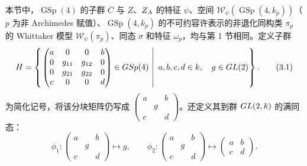 本节中，$\operatorname{GSp}(4)$ 的子群 $C$ 与 $Z$、$Z_A$ 的特征 $\psi$、空间 $\mathcal W_\psi(\operatorname{GSp}(4,k_p))$（$p$ 为非 Archimedes 赋值）、$\operatorname{GSp}(4,k_p)$ 的不可约容许表示的非退化同构类 $\pi_p$ 的 Whittaker 模型 $\mathcal W_\psi(\pi_p)$、同态 $\sigma$ 和特征 $\omega_p$，均与第 1 节相同。定义子群
\begin{equation}
 H=\left\{\left.
 \begin{pmatrix}a&0&0&b\\0&g_{11}&g_{12}&0\\0&g_{21}&g_{22}&0\\c&0&0&d\end{pmatrix}
 \in GSp(4)\ \right|\ a,b,c,d\in k,\quad g\in GL(2)\right\}.
 \tag{3.1}
\end{equation}
为简化记号，将该分块矩阵仍写成 $\begin{pmatrix}a&&b\\&g&\\c&&d\end{pmatrix}$。还定义其到群 $GL(2,k)$ 的满同态：
\begin{equation}
 \phi_1:\begin{pmatrix}a&&b\\&g&\\c&&d\end{pmatrix}\longmapsto g,
 \qquad
 \phi_2:\begin{pmatrix}a&&b\\&g&\\c&&d\end{pmatrix}\longmapsto
 \begin{pmatrix}a&b\\c&d\end{pmatrix}.
 \tag{3.2}
\end{equation}

